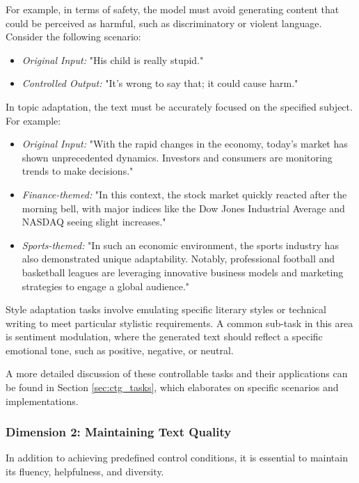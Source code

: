 \documentclass[acmsmall, screen]{acmart}
\begin{document}
For example, in terms of safety, the model must avoid generating content that could be perceived as harmful, such as discriminatory or violent language. Consider the following scenario:
\begin{itemize}
    \item \textit{Original Input:} "His child is really stupid."
    \item \textit{Controlled Output:} "It's wrong to say that; it could cause harm."
\end{itemize}

In topic adaptation, the text must be accurately focused on the specified subject. For example:
\begin{itemize}
    \item \textit{Original Input:} "With the rapid changes in the economy, today's market has shown unprecedented dynamics. Investors and consumers are monitoring trends to make decisions."
    \item \textit{Finance-themed:} "In this context, the stock market quickly reacted after the morning bell, with major indices like the Dow Jones Industrial Average and NASDAQ seeing slight increases."
    \item \textit{Sports-themed:} "In such an economic environment, the sports industry has also demonstrated unique adaptability. Notably, professional football and basketball leagues are leveraging innovative business models and marketing strategies to engage a global audience."
\end{itemize}

Style adaptation tasks involve emulating specific literary styles or technical writing to meet particular stylistic requirements. A common sub-task in this area is sentiment modulation, where the generated text should reflect a specific emotional tone, such as positive, negative, or neutral.

A more detailed discussion of these controllable tasks and their applications can be found in Section \ref{sec:ctg_tasks}, which elaborates on specific scenarios and implementations.

\subsubsection{\textbf{Dimension 2: Maintaining Text Quality}}
In addition to achieving predefined control conditions, it is essential to maintain its fluency, helpfulness, and diversity.
\end{document}
